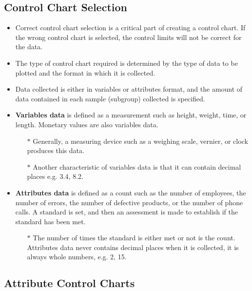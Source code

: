 \documentclass[MASTER-SPC.tex]{subfiles}
\begin{document}
\subsection{Control Chart Selection}
\begin{itemize}
	\item Correct control chart selection is a critical part of creating a control chart. If the wrong control chart is selected, the control limits will not be correct for the data. 
	\item The type of control chart required is determined by the type of data to be plotted and the format in which it is collected. \item Data collected is either in variables or attributes format, and the amount of data contained in each sample (subgroup) collected is specified.
	
	\item \textbf{Variables data} is defined as a measurement such as height, weight, time, or length. Monetary values are also variables data. 
	\begin{itemize}
		\item[$\ast$] Generally, a measuring device such as a weighing scale, vernier, or clock produces this data. \item[$\ast$] Another characteristic of variables data is that it can contain decimal places e.g. 3.4, 8.2.
	\end{itemize}
	
	\item \textbf{Attributes data} is defined as a count such as the number of employees, the number of errors, the number of defective products, or the number of phone calls. A standard is set, and then an assessment is made to establish if the standard has been met. 
	\begin{itemize}
		\item[$\ast$] The number of times the standard is either met or not is the count. Attributes data never contains decimal places when it is collected, it is always whole numbers, e.g. 2, 15.
	\end{itemize}
\end{itemize}

\newpage

\subsection{Attribute Control Charts}
\end{document}
